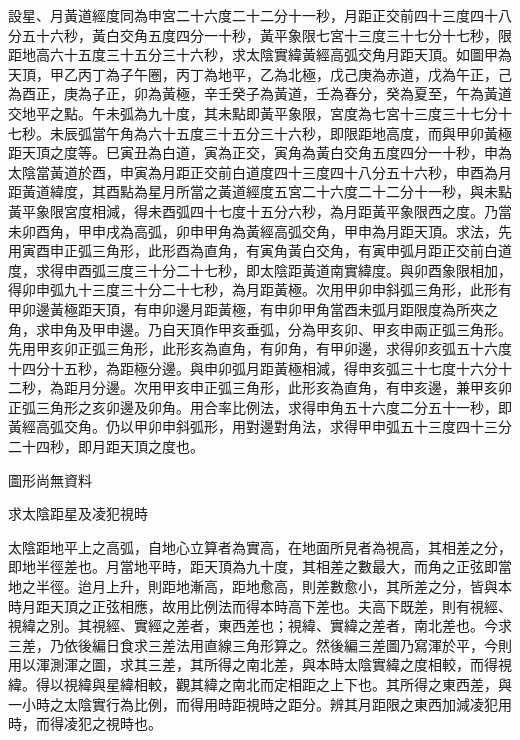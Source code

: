 \begin{pinyinscope}
設星、月黃道經度同為申宮二十六度二十二分十一秒，月距正交前四十三度四十八分五十六秒，黃白交角五度四分一十秒，黃平象限七宮十三度三十七分十七秒，限距地高六十五度三十五分三十六秒，求太陰實緯黃經高弧交角月距天頂。如圖甲為天頂，甲乙丙丁為子午圈，丙丁為地平，乙為北極，戊己庚為赤道，戊為午正，己為酉正，庚為子正，卯為黃極，辛壬癸子為黃道，壬為春分，癸為夏至，午為黃道交地平之點。午未弧為九十度，其未點即黃平象限，宮度為七宮十三度三十七分十七秒。未辰弧當午角為六十五度三十五分三十六秒，即限距地高度，而與甲卯黃極距天頂之度等。巳寅丑為白道，寅為正交，寅角為黃白交角五度四分一十秒，申為太陰當黃道於酉，申寅為月距正交前白道度四十三度四十八分五十六秒，申酉為月距黃道緯度，其酉點為星月所當之黃道經度五宮二十六度二十二分十一秒，與未點黃平象限宮度相減，得未酉弧四十七度十五分六秒，為月距黃平象限西之度。乃當未卯酉角，甲申戌為高弧，卯申甲角為黃經高弧交角，甲申為月距天頂。求法，先用寅酉申正弧三角形，此形酉為直角，有寅角黃白交角，有寅申弧月距正交前白道度，求得申酉弧三度三十分二十七秒，即太陰距黃道南實緯度。與卯酉象限相加，得卯申弧九十三度三十分二十七秒，為月距黃極。次用甲卯申斜弧三角形，此形有甲卯邊黃極距天頂，有申卯邊月距黃極，有申卯甲角當酉未弧月距限度為所夾之角，求申角及甲申邊。乃自天頂作甲亥垂弧，分為甲亥卯、甲亥申兩正弧三角形。先用甲亥卯正弧三角形，此形亥為直角，有卯角，有甲卯邊，求得卯亥弧五十六度十四分十五秒，為距極分邊。與申卯弧月距黃極相減，得申亥弧三十七度十六分十二秒，為距月分邊。次用甲亥申正弧三角形，此形亥為直角，有申亥邊，兼甲亥卯正弧三角形之亥卯邊及卯角。用合率比例法，求得申角五十六度二分五十一秒，即黃經高弧交角。仍以甲卯申斜弧形，用對邊對角法，求得甲申弧五十三度四十三分二十四秒，即月距天頂之度也。

圖形尚無資料

求太陰距星及凌犯視時

太陰距地平上之高弧，自地心立算者為實高，在地面所見者為視高，其相差之分，即地半徑差也。月當地平時，距天頂為九十度，其相差之數最大，而角之正弦即當地之半徑。迨月上升，則距地漸高，距地愈高，則差數愈小，其所差之分，皆與本時月距天頂之正弦相應，故用比例法而得本時高下差也。夫高下既差，則有視經、視緯之別。其視經、實經之差者，東西差也；視緯、實緯之差者，南北差也。今求三差，乃依後編日食求三差法用直線三角形算之。然後編三差圖乃寫渾於平，今則用以渾測渾之圖，求其三差，其所得之南北差，與本時太陰實緯之度相較，而得視緯。得以視緯與星緯相較，觀其緯之南北而定相距之上下也。其所得之東西差，與一小時之太陰實行為比例，而得用時距視時之距分。辨其月距限之東西加減凌犯用時，而得凌犯之視時也。


\end{pinyinscope}
